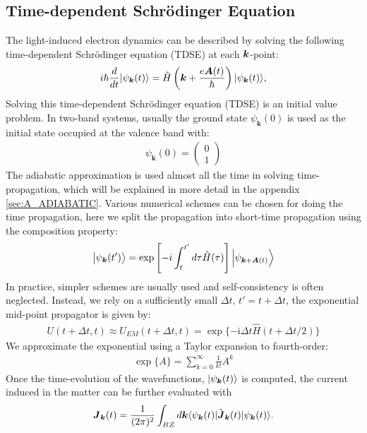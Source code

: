 \subsection{Time-dependent Schr\"odinger Equation}
The light-induced electron dynamics can be described by solving the following time-dependent Schr\"odinger equation (\gls {TDSE}) at each $\boldsymbol k$-point:
\begin{equation}
i\hbar \frac{d}{dt}| \psi_{\boldsymbol {k}}(t) \rangle = \hat{H}\left ( \boldsymbol k + \frac{e\boldsymbol A(t)}{\hbar} \right )| \psi_{\boldsymbol k}(t) \rangle,
\label{eqn:TDSE}
\end{equation}
Solving this time-dependent Schr\"odinger equation (\gls {TDSE}) is an initial value problem. In two-band systems, usually the ground state $\psi_{\boldsymbol k}(0)$ is used as the initial state occupied at the valence band with:
\begin{align}
\psi_{\boldsymbol k}(0) = \left(\begin{array}{cc}
0 \\
1
\end{array}\right)
\end{align}
The adiabatic approximation is used almost all the time in solving time-propagation, which will be explained in more detail in the appendix \ref{sec:A_ADIABATIC}. Various numerical schemes can be chosen for doing the time propagation, here we split the propagation into short-time propagation using the composition property:
\begin{equation}
\left|\psi_{\boldsymbol{k}}(t')\right\rangle=\exp \left[-i \int_{t}^{t'} d \tau \hat{H}(\tau) \right]\left|\psi_{\boldsymbol{k}+\boldsymbol{A}(t)}\right\rangle
\label{eqn:Houston}
\end{equation}
In practice, simpler schemes are usually used and self-consistency is often neglected. Instead, we rely on a sufficiently small $\Delta t$, $t'=t+\Delta t$, the exponential mid-point propagator is given by:
\begin{align}
    U(t+\Delta t, t) \approx U_{E M}(t+\Delta t, t)=\exp \{-\mathrm{i} \Delta t \hat{H}(t+\Delta t / 2)\}
\end{align}
We approximate the exponential using a Taylor expansion to fourth-order:
\begin{align}
    \exp \{A\}=\sum_{k=0}^{\infty} \frac{1}{k!} A^k
\end{align}
Once the time-evolution of the wavefunctions, $|\psi_{\boldsymbol k}(t)\rangle$ is computed, the current induced in the matter can be further evaluated with
\begin{align}
\boldsymbol{J}_{\boldsymbol k}(t)=\frac{1}{(2\pi)^2} \int_{BZ} d\boldsymbol k\langle \psi_{\boldsymbol k}(t)|\hat{\boldsymbol J}_{\boldsymbol k}(t)| \psi_{\boldsymbol{k}}(t)\rangle.
\label{eq:current}
\end{align}
